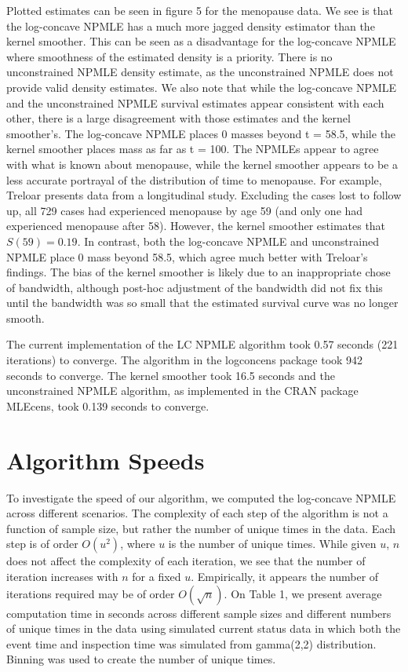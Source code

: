 	Plotted estimates can be seen in figure 5 for the menopause data. We see is that the log-concave NPMLE has a much more jagged density estimator than the kernel smoother. This can be seen as a disadvantage for the log-concave NPMLE where smoothness of the estimated density is a priority. There is no unconstrained NPMLE density estimate, as the unconstrained NPMLE does not provide valid density estimates. We also note that while the log-concave NPMLE and the unconstrained NPMLE survival estimates appear consistent with each other, there is a large disagreement with those estimates and the kernel smoother's. The log-concave NPMLE places 0 masses beyond t = 58.5, while the kernel smoother places mass as far as t = 100. The NPMLEs appear to agree with what is known about menopause, while the kernel smoother appears to be a less accurate portrayal of the distribution of time to menopause. For example, Treloar \cite{RefT1981} presents data from a longitudinal study. Excluding the cases lost to follow up, all 729 cases had experienced menopause by age 59 (and only one had experienced menopause after 58). However, the kernel smoother estimates that $S(59) =  0.19$. In contrast, both the log-concave NPMLE and unconstrained NPMLE place 0 mass beyond 58.5, which agree much better with Treloar's findings. The bias of the kernel smoother is likely due to an inappropriate chose of bandwidth, although post-hoc adjustment of the bandwidth did not fix this until the bandwidth was so small that the estimated survival curve was no longer smooth. 
	
	 The current implementation of the LC NPMLE algorithm took 0.57 seconds (221 iterations) to converge. The algorithm in the logconcens package took 942 seconds to converge. The kernel smoother took 16.5 seconds and the unconstrained NPMLE algorithm, as implemented in the CRAN package  MLEcens, took 0.139 seconds to converge. 


{\section{Algorithm Speeds} } 
\label{sec:7}	

	To investigate the speed of our algorithm, we computed the log-concave NPMLE across different scenarios. The complexity of each step of the algorithm is not a function of sample size, but rather the number of unique times in the data. Each step is of order $O(u^2)$, where $u$ is the number of unique times. While given $u$, $n$ does not affect the complexity of each iteration,  we see that the number of iteration increases with $n$ for a fixed $u$. Empirically, it appears the number of iterations required may be of order $O(\sqrt{n})$. On Table 1, we present average computation time in seconds across different sample sizes and different numbers of unique times in the data using simulated current status data in which both the event time and inspection time was simulated from gamma(2,2) distribution. Binning was used to create the number of unique times. 
	
